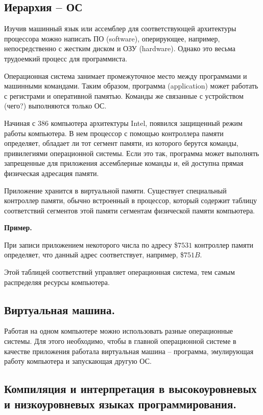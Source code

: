 \documentclass[a4paper, fleqn]{article}
\newenvironment{example}[1][]{\medskip \noindent \textbf{Пример. #1}\par \nopagebreak}{\medskip \par} %
\begin{document}
			
			\subsection*{Иерархия – ОС} 
			Изучив машинный язык или ассемблер для соответствующей архитектуры процессора можно написать ПО (software), оперирующее, например, непосредственно с жестким диском и ОЗУ (hardware). Однако это весьма трудоемкий процесс для программиста. 
			
			Операционная система занимает промежуточное место между программами и машинными командами. Таким образом, программа (application) может работать с регистрами и оперативной памятью. Команды же связанные с устройством (чего?) выполняются только ОС.
			
			Начиная с 386 компьютера архитектуры Intel, появился защищенный режим работы компьютера. В нем процессор с помощью контроллера памяти определяет, обладает ли тот сегмент памяти, из которого берутся команды, привилегиями операционной системы. Если это так, программа может выполнять запрещенные для приложения ассемблерные команды и, ей доступна прямая физическая адресация памяти. 
			
			Приложение хранится в виртуальной памяти. Существует специальный контроллер памяти,
			обычно встроенный в процессор, который содержит таблицу соответствий сегментов этой памяти сегментам физической памяти компьютера.
			
			\begin{example}
				
				При записи приложением некоторого числа по адресу \$$7531$ контроллер памяти определяет, что данный адрес соответствует, например, \$$751B$. 
			\end{example}
			
			
			Этой таблицей соответствий управляет операционная система, тем самым распределяя ресурсы компьютера.
			
			\subsection*{Виртуальная машина.} 
		
			Работая на одном компьютере можно использовать разные операционные системы. Для этого необходимо, чтобы в главной операционной системе в качестве приложения работала виртуальная машина  – программа, эмулирующая работу компьютера и запускающая другую ОС. 
			
			\subsection*{Компиляция и интерпретация в высокоуровневых и низкоуровневых языках программирования.}
			
\end{document}
